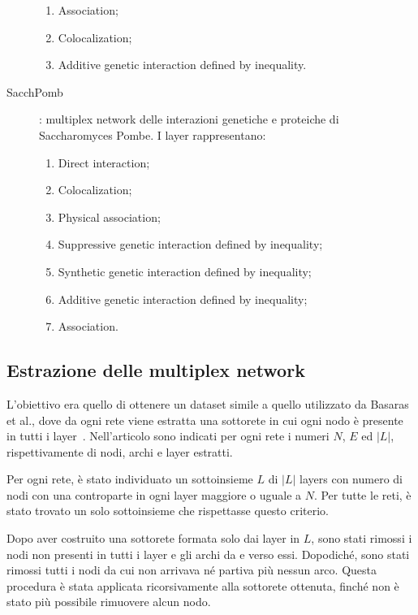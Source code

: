 \begin{description}
\begin{enumerate}
            \item Association;
            \item Colocalization;
            \item Additive genetic interaction defined by inequality.
        \end{enumerate} 
    \item[SacchPomb]: multiplex network delle interazioni genetiche e proteiche di 
        Saccharomyces Pombe. I layer rappresentano:
        \begin{enumerate}
            \item Direct interaction;
            \item Colocalization;
            \item Physical association;
            \item Suppressive genetic interaction defined by inequality;
            \item Synthetic genetic interaction defined by inequality;
            \item Additive genetic interaction defined by inequality;
            \item Association.
        \end{enumerate} 
\end{description}

\subsection{Estrazione delle multiplex network}
L'obiettivo era quello di ottenere un dataset simile a quello utilizzato da Basaras et al.,
dove da ogni rete viene estratta una sottorete in cui ogni nodo è presente in tutti i layer~\cite{basaras:infspmul}.
Nell'articolo sono indicati per ogni rete i numeri $N$, $E$ ed $|L|$, rispettivamente di nodi, 
archi e layer estratti.

Per ogni rete, è stato individuato un sottoinsieme $L$ di $|L|$ layers con
numero di nodi con una controparte in ogni layer maggiore o uguale a $N$. 
Per tutte le reti, è  stato trovato un solo sottoinsieme 
che rispettasse questo criterio.

Dopo aver costruito una sottorete formata solo dai layer in $L$, sono stati rimossi i nodi non presenti
in tutti i layer e gli archi da e verso essi. Dopodiché, sono stati rimossi tutti i nodi da cui non arrivava
né partiva più nessun arco. Questa procedura è stata applicata ricorsivamente alla sottorete ottenuta, 
finché non è stato più possibile rimuovere alcun nodo.


